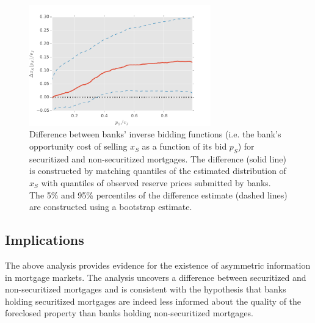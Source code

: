 \documentclass[11pt,twopage]{article}
\begin{document}
\begin{figure}[htp]
	\begin{center}
		\includegraphics[width=0.7\textwidth]{graphics/xs-diff-10-line}
		\caption{Difference between banks' inverse bidding functions (i.e. the bank's opportunity cost of selling $x_S$ as a function of its bid $p_S$) for securitized and non-securitized mortgages. The difference (solid line) is constructed by matching quantiles of the estimated distribution of $x_S$ with quantiles of observed reserve prices submitted by banks. The 5\% and 95\% percentiles of the difference estimate (dashed lines) are constructed using a bootstrap estimate.\label{fig:xs-diff-10}}
	\end{center}
\end{figure}

\subsection{Implications}

The above analysis provides evidence for the existence of asymmetric information in mortgage markets. The analysis uncovers a difference between securitized and non-securitized mortgages and is consistent with the hypothesis that banks holding securitized mortgages are indeed less informed about the quality of the foreclosed property than banks holding non-securitized mortgages.
\end{document}
